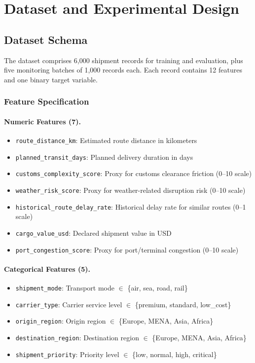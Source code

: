 \documentclass[11pt,a4paper]{article}
\begin{document}
\section{Dataset and Experimental Design}
\label{sec:data}

\subsection{Dataset Schema}

The dataset comprises 6,000 shipment records for training and evaluation, plus five monitoring batches of 1,000 records each. Each record contains 12 features and one binary target variable.

\subsubsection{Feature Specification}

\paragraph{Numeric Features (7).}
\begin{itemize}
    \item \texttt{route\_distance\_km}: Estimated route distance in kilometers
    \item \texttt{planned\_transit\_days}: Planned delivery duration in days
    \item \texttt{customs\_complexity\_score}: Proxy for customs clearance friction (0--10 scale)
    \item \texttt{weather\_risk\_score}: Proxy for weather-related disruption risk (0--10 scale)
    \item \texttt{historical\_route\_delay\_rate}: Historical delay rate for similar routes (0--1 scale)
    \item \texttt{cargo\_value\_usd}: Declared shipment value in USD
    \item \texttt{port\_congestion\_score}: Proxy for port/terminal congestion (0--10 scale)
\end{itemize}

\paragraph{Categorical Features (5).}
\begin{itemize}
    \item \texttt{shipment\_mode}: Transport mode $\in$ \{air, sea, road, rail\}
    \item \texttt{carrier\_type}: Carrier service level $\in$ \{premium, standard, low\_cost\}
    \item \texttt{origin\_region}: Origin region $\in$ \{Europe, MENA, Asia, Africa\}
    \item \texttt{destination\_region}: Destination region $\in$ \{Europe, MENA, Asia, Africa\}
    \item \texttt{shipment\_priority}: Priority level $\in$ \{low, normal, high, critical\}
\end{itemize}
\end{document}
